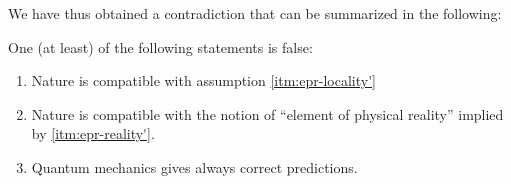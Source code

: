 We have thus obtained a contradiction that can be summarized in the following:
\begin{theorem}
  One (at least) of the following statements is false:
  \begin{enumerate}[label=(\roman*)]
  \item Nature is compatible with assumption \ref{itm:epr-locality'}
  \item Nature is compatible with the notion of ``element of physical reality'' implied by \ref{itm:epr-reality'}.
  \item Quantum mechanics gives always correct predictions.
  \end{enumerate}
\end{theorem}


